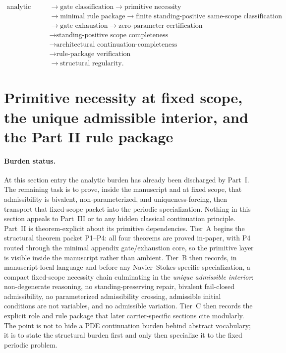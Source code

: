 \begin{tcolorbox}[title=Navier--Stokes admissibility cascade]
\[
\begin{aligned}
\text{analytic atlas}
&\rightarrow \text{gate classification}
\rightarrow \text{primitive necessity}\\
&\rightarrow \text{minimal rule package}
\rightarrow \text{finite standing-positive same-scope classification}\\
&\rightarrow \text{gate exhaustion}
\rightarrow \text{zero-parameter certification}\\
&\rightarrow \text{standing-positive scope completeness}\\
&\rightarrow \text{architectural continuation-completeness}\\
&\rightarrow \text{rule-package verification}\\
&\rightarrow \text{structural regularity}.
\end{aligned}
\]
\end{tcolorbox}


\section{Primitive necessity at fixed scope, the unique admissible interior, and the Part II rule package}\label{sec:primitive-base}
\paragraph{Burden status.}
At this section entry the analytic burden has already been discharged by Part~I. The remaining task is to prove, inside the manuscript and at fixed scope, that admissibility is bivalent, non-parameterized, and uniqueness-forcing, then transport that fixed-scope packet into the periodic specialization. Nothing in this section appeals to Part~III or to any hidden classical continuation principle.
Part~II is theorem-explicit about its primitive dependencies. Tier~A begins the structural theorem packet P1--P4: all four theorems are proved in-paper, with P4 routed through the minimal appendix gate/exhaustion core, so the primitive layer is visible inside the manuscript rather than ambient. Tier~B then records, in manuscript-local language and before any Navier--Stokes-specific specialization, a compact fixed-scope necessity chain culminating in the \emph{unique admissible interior}: non-degenerate reasoning, no standing-preserving repair, bivalent fail-closed admissibility, no parameterized admissibility crossing, admissible initial conditions are not variables, and no admissible variation. Tier~C then records the explicit role and rule package that later carrier-specific sections cite modularly. The point is not to hide a PDE continuation burden behind abstract vocabulary; it is to state the structural burden first and only then specialize it to the fixed periodic problem.

